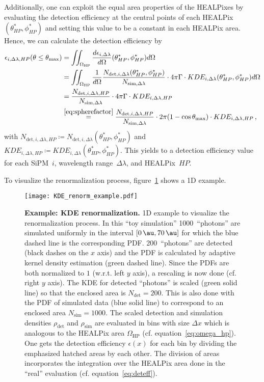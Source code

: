 Additionally, one can exploit the equal area properties of the HEALPixes by evaluating the detection efficiency at the central points of each HEALPix $(\theta^\ast_{HP},\phi^\ast_{HP})$ and setting this value to be a constant in each HEALPix area. Hence, we can calculate the detection efficiency by
\begin{align}
	\epsilon_{i,\Delta\lambda,HP}(\theta\leq\theta_\text{max}) &= \iint_{\Omega_\text{HP}}  \frac{d\epsilon_{i,\Delta\lambda}}{d\Omega}(\theta^\ast_{HP},\phi^\ast_{HP}) d\Omega\nonumber\\
	&= \iint_{\Omega_\text{HP}}\frac{1}{d\Omega}\frac{N_{\text{det},i,\Delta\lambda}(\theta^\ast_{HP},\phi^\ast_{HP})}{N_{\text{sim},\Delta\lambda}}\cdot 4\pi\Gamma\cdot KDE_{i,\Delta\lambda}(\theta^\ast_{HP},\phi^\ast_{HP})d\Omega\nonumber\\
	&= \frac{N_{\text{det},i,\Delta\lambda,HP}}{N_{\text{sim},\Delta\lambda}}\cdot 4\pi\Gamma\cdot KDE_{i,\Delta\lambda,HP}\nonumber\\
	&\overset{\eqref{eq:spherefactor}}{=} \frac{N_{\text{det},i,\Delta\lambda,HP}}{N_{\text{sim},\Delta\lambda}}\cdot 2\pi(1-\cos\theta_\text{max})\cdot KDE_{i,\Delta\lambda,HP}\,,
	\label{eq:deteff}
\end{align}
with $N_{\text{det},i,\Delta\lambda,HP}\coloneqq N_{\text{det},i,\Delta\lambda}(\theta^\ast_{HP},\phi^\ast_{HP})$ and $KDE_{i,\Delta\lambda,HP}\coloneqq KDE_{i,\Delta\lambda}(\theta^\ast_{HP},\phi^\ast_{HP})$. This yields to a detection efficiency value for each SiPM~$i$, wavelength range~$\Delta\lambda$, and HEALPix~$HP$.

To visualize the renormalization process, figure~\ref{deteff:1d_example} shows a 1D example.

\begin{figure}[h]
	\centering
	\texttt{[image: KDE\_renorm\_example.pdf]}
	\caption[Example: KDE renormalization]{\textbf{Example: KDE renormalization.} 1D example to visualize the renormalization process. In this \enquote{toy simulation} \num{1000}~\enquote{photons} are simulated uniformly in the interval $[\SI{0}{\au},\SI{70}{\au}]$ for which the blue dashed line is the corresponding PDF. \num{200}~\enquote{photons} are detected (black dashes on the $x$ axis) and the PDF is calculated by adaptive kernel density estimation (green dashed line). Since the PDFs are both normalized to $1$ (w.r.t. left $y$ axis), a rescaling is now done (cf. right $y$ axis). The KDE for detected \enquote{photons} is scaled (green solid line) so that the enclosed area is $N_\text{det}=\num{200}$. This is also done with the PDF of simulated data (blue solid line) to correspond to an enclosed area $N_\text{sim}=\num{1000}$. The scaled detection and simulation densities $\rho_\text{det}$ and $\rho_\text{sim}$ are evaluated in bins with size $\Delta x$ which is analogous to the HEALPix area $\Omega_\text{HP}$ (cf. equation~\eqref{eq:omega_hp}). One gets the detection efficiency $\epsilon(x)$ for each bin by dividing the emphasized hatched areas by each other. The division of areas incorporates the integration over the HEALPix area done in the \enquote{real} evaluation (cf. equation~\eqref{eq:deteff}).}
	\label{deteff:1d_example}	
\end{figure}

